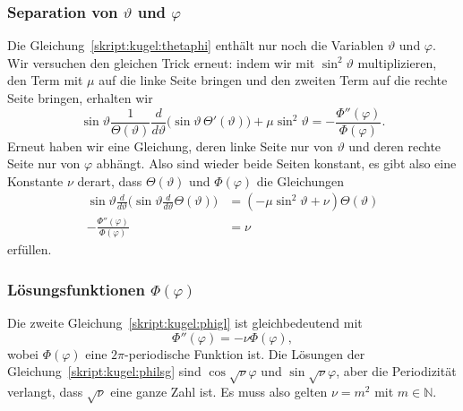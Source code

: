 \subsubsection{Separation von $\vartheta$ und $\varphi$}
Die Gleichung~\eqref{skript:kugel:thetaphi} enthält nur noch die
Variablen $\vartheta$ und $\varphi$. 
Wir versuchen den gleichen Trick erneut: indem wir mit $\sin^2\vartheta$
multiplizieren, den Term mit $\mu$ auf die linke Seite bringen und
den zweiten Term auf die rechte Seite bringen, erhalten wir
\[
\sin\vartheta
\frac{1}{\Theta(\vartheta)}
\frac{d}{d\vartheta}\bigl(\sin\vartheta\,\Theta'(\vartheta)\bigr)
+
\mu\sin^2\vartheta
=
-\frac{\Phi''(\varphi)}{\Phi(\varphi)}.
\]
Erneut haben wir eine Gleichung, deren linke Seite nur von $\vartheta$
und deren rechte Seite nur von $\varphi$ abhängt.
Also sind wieder beide Seiten konstant, es gibt also eine Konstante
$\nu$ derart, dass $\Theta(\vartheta)$ und $\Phi(\varphi)$ die 
Gleichungen
\begin{align}
\sin\vartheta\frac{d}{d\vartheta}
\biggl(
\sin\vartheta\frac{d}{d\vartheta}\Theta(\vartheta)
\biggr)
&=
(-\mu\sin^2\vartheta+\nu)\Theta(\vartheta)
\label{skript:kugel:thetagl}
\\
-\frac{\Phi''(\varphi)}{\Phi(\varphi)}&=\nu
\label{skript:kugel:phigl}
\end{align}
erfüllen.

\subsubsection{Lösungsfunktionen $\Phi(\varphi)$}
Die zweite Gleichung~\eqref{skript:kugel:phigl} ist gleichbedeutend mit
\begin{equation}
\Phi''(\varphi)=-\nu\Phi(\varphi),
\label{skript:kugel:philsg}
\end{equation}
wobei $\Phi(\varphi)$ eine $2\pi$-periodische Funktion ist.
Die Lösungen der Gleichung~\eqref{skript:kugel:philsg}
sind $\cos\sqrt{\nu}\varphi$ und $\sin\sqrt{\nu}\varphi$,
aber die Periodizität verlangt, dass $\sqrt{\nu}$ eine ganze Zahl ist.
Es muss also gelten $\nu=m^2$ mit $m\in \mathbb N$.

